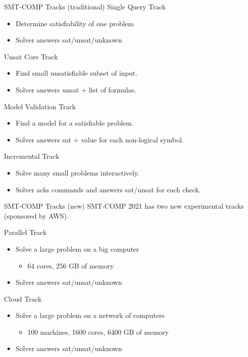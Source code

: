\documentclass[table]{beamer}
\def\emph#1{\textcolor{MYblue}{#1}}
\begin{document}
\begin{frame}[fragile]{SMT-COMP Tracks (traditional)}
  \emph{Single Query Track}
  \begin{itemize}
  \item Determine satisfiability of one problem
  \item Solver answers sat/unsat/unknown
  \end{itemize}
  \medskip

  \emph{Unsat Core Track}
  \begin{itemize}
  \item Find small unsatisfiable subset of input.
  \item Solver answers unsat + list of formulas.
  \end{itemize}
  \medskip
 
  \emph{Model Validation Track}
  \begin{itemize}
  \item Find a model for a satisfiable problem.
  \item Solver answers sat + value for each non-logical symbol.
  \end{itemize}
  \medskip

  \emph{Incremental Track}
  \begin{itemize}
  \item Solve many small problems interactively.
  \item Solver acks commands and answers sat/unsat for each check.
  \end{itemize}
\end{frame}

\begin{frame}[fragile]{SMT-COMP Tracks (new)}
  SMT-COMP 2021 has two new experimental tracks (sponsored by AWS).
  \bigskip
  
  \emph{Parallel Track}
  \begin{itemize}
  \item Solve a large problem on a big computer
    \begin{itemize}
    \item 64 cores, 256 GB of memory
    \end{itemize}
  \item Solver answers sat/unsat/unknown
  \end{itemize}
  \bigskip
  \emph{Cloud Track}
  \begin{itemize}
  \item Solve a large problem on a network of computers
    \begin{itemize}
    \item 100 machines, 1600 cores, 6400 GB of memory
    \end{itemize}
  \item Solver answers sat/unsat/unknown
  \end{itemize}
\end{frame}
\end{document}

